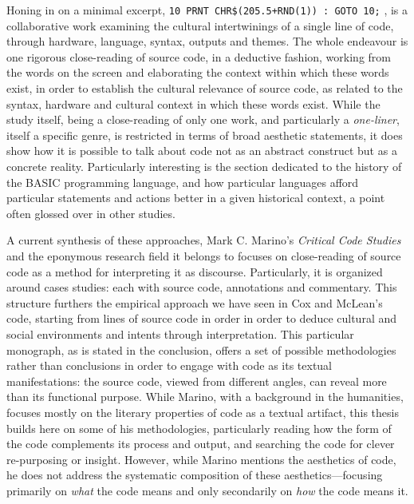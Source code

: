 Honing in on a minimal excerpt, \lstinline{10 PRNT CHR$(205.5+RND(1)) : GOTO 10;} \citep{montfort_10_2014}, is a collaborative work examining the cultural intertwinings of a single line of code, through hardware, language, syntax, outputs and themes. The whole endeavour is one rigorous close-reading of source code, in a deductive fashion, working from the words on the screen and elaborating the context within which these words exist, in order to establish the cultural relevance of source code, as related to the syntax, hardware and cultural context in which these words exist. While the study itself, being a close-reading of only one work, and particularly a \emph{one-liner}, itself a specific genre, is restricted in terms of broad aesthetic statements, it does show how it is possible to talk about code not as an abstract construct but as a concrete reality. Particularly interesting is the section dedicated to the history of the BASIC programming language, and how particular languages afford particular statements and actions better in a given historical context, a point often glossed over in other studies.

A current synthesis of these approaches, Mark C. Marino's \emph{Critical Code Studies} \citep{marino_critical_2020} and the eponymous research field it belongs to focuses on close-reading of source code as a method for interpreting it as discourse. Particularly, it is organized around cases studies: each with source code, annotations and commentary. This structure furthers the empirical approach we have seen in Cox and McLean's code, starting from lines of source code in order in order to deduce cultural and social environments and intents through interpretation. This particular monograph, as is stated in the conclusion, offers a set of possible methodologies rather than conclusions in order to engage with code as its textual manifestations: the source code, viewed from different angles, can reveal more than its functional purpose. While Marino, with a background in the humanities, focuses mostly on the literary properties of code as a textual artifact, this thesis builds here on some of his methodologies, particularly reading how the form of the code complements its process and output, and searching the code for clever re-purposing or insight. However, while Marino mentions the aesthetics of code, he does not address the systematic composition of these aesthetics—focusing primarily on \emph{what} the code means and only secondarily on \emph{how} the code means it.

